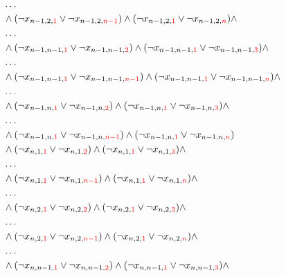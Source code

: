 \documentclass[11pt, a4paper]{article}
\begin{document}
\begin{align*}
		\\ & \dots \\
		& \wedge (\neg x_{n-1,2,{\color{red} 1}} \vee \neg x_{n-1,2,{\color{red} n-1}}) \wedge (\neg x_{n-1,2,{\color{red} 1}} \vee \neg x_{n-1,2,{\color{red} n}}) \wedge
		\\ & \dots \\
		& \wedge (\neg x_{n-1,n-1,{\color{red} 1}} \vee \neg x_{n-1,n-1,{\color{red} 2}}) \wedge (\neg x_{n-1,n-1,{\color{red} 1}} \vee \neg x_{n-1,n-1,{\color{red} 3}}) \wedge 
		\\ & \dots \\
		& \wedge (\neg x_{n-1,n-1,{\color{red} 1}} \vee \neg x_{n-1,n-1,{\color{red} n-1}}) \wedge (\neg x_{n-1,n-1,{\color{red} 1}} \vee \neg x_{n-1,n-1,{\color{red} n}}) \wedge
		\\ & \dots \\
		& \wedge (\neg x_{n-1,n,{\color{red} 1}} \vee \neg x_{n-1,n,{\color{red} 2}}) \wedge (\neg x_{n-1,n,{\color{red} 1}} \vee \neg x_{n-1,n,{\color{red} 3}}) \wedge 
		\\ & \dots \\
		& \wedge (\neg x_{n-1,n,{\color{red} 1}} \vee \neg x_{n-1,n,{\color{red} n-1}})
		\wedge (\neg x_{n-1,n,{\color{red} 1}} \vee \neg x_{n-1,n,{\color{red} n}}) \\
		& \wedge (\neg x_{n,1,{\color{red} 1}} \vee \neg x_{n,1,{\color{red} 2}}) \wedge (\neg x_{n,1,{\color{red} 1}} \vee \neg x_{n,1,{\color{red} 3}}) \wedge 
		\\ & \dots \\
		& \wedge (\neg x_{n,1,{\color{red} 1}} \vee \neg x_{n,1,{\color{red} n-1}}) \wedge (\neg x_{n,1,{\color{red} 1}} \vee \neg x_{n,1,{\color{red} n}}) \wedge
		\\ & \dots \\
		& \wedge (\neg x_{n,2,{\color{red} 1}} \vee \neg x_{n,2,{\color{red} 2}}) \wedge (\neg x_{n,2,{\color{red} 1}} \vee \neg x_{n,2,{\color{red} 3}}) \wedge 
		\\ & \dots \\
		& \wedge (\neg x_{n,2,{\color{red} 1}} \vee \neg x_{n,2,{\color{red} n-1}}) \wedge (\neg x_{n,2,{\color{red} 1}} \vee \neg x_{n,2,{\color{red} n}}) \wedge
		\\ & \dots \\
		& \wedge (\neg x_{n,n-1,{\color{red} 1}} \vee \neg x_{n,n-1,{\color{red} 2}}) \wedge (\neg x_{n,n-1,{\color{red} 1}} \vee \neg x_{n,n-1,{\color{red} 3}}) \wedge

\end{align*}
\end{document}
